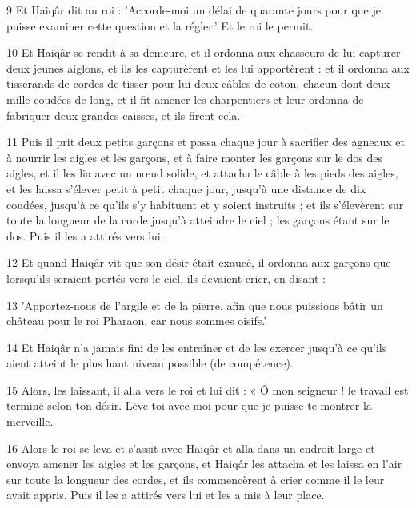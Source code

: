 \par 9 Et Haiqâr dit au roi : 'Accorde-moi un délai de quarante jours pour que je puisse examiner cette question et la régler.' Et le roi le permit.

\par 10 Et Haiqâr se rendit à sa demeure, et il ordonna aux chasseurs de lui capturer deux jeunes aiglons, et ils les capturèrent et les lui apportèrent : et il ordonna aux tisserands de cordes de tisser pour lui deux câbles de coton, chacun dont deux mille coudées de long, et il fit amener les charpentiers et leur ordonna de fabriquer deux grandes caisses, et ils firent cela.

\par 11 Puis il prit deux petits garçons et passa chaque jour à sacrifier des agneaux et à nourrir les aigles et les garçons, et à faire monter les garçons sur le dos des aigles, et il les lia avec un nœud solide, et attacha le câble à les pieds des aigles, et les laissa s'élever petit à petit chaque jour, jusqu'à une distance de dix coudées, jusqu'à ce qu'ils s'y habituent et y soient instruits ; et ils s'élevèrent sur toute la longueur de la corde jusqu'à atteindre le ciel ; les garçons étant sur le dos. Puis il les a attirés vers lui.

\par 12 Et quand Haiqâr vit que son désir était exaucé, il ordonna aux garçons que lorsqu'ils seraient portés vers le ciel, ils devaient crier, en disant :

\par 13 'Apportez-nous de l'argile et de la pierre, afin que nous puissions bâtir un château pour le roi Pharaon, car nous sommes oisifs.'

\par 14 Et Haiqâr n'a jamais fini de les entraîner et de les exercer jusqu'à ce qu'ils aient atteint le plus haut niveau possible (de compétence).

\par 15 Alors, les laissant, il alla vers le roi et lui dit : « Ô mon seigneur ! le travail est terminé selon ton désir. Lève-toi avec moi pour que je puisse te montrer la merveille.

\par 16 Alors le roi se leva et s'assit avec Haiqâr et alla dans un endroit large et envoya amener les aigles et les garçons, et Haiqâr les attacha et les laissa en l'air sur toute la longueur des cordes, et ils commencèrent à crier comme il le leur avait appris. Puis il les a attirés vers lui et les a mis à leur place.


